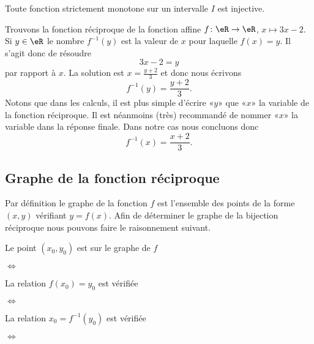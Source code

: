 \begin{remark}
  Toute fonction strictement monotone sur un intervalle $I$ est injective. 
\end{remark}

\begin{example}
    Trouvons la fonction réciproque de la fonction affine \( f\colon \eR\to \eR\), \( x\mapsto 3x-2\). Si \( y\in \eR\) le nombre \( f^{-1}(y)\) est la valeur de \( x\) pour laquelle \( f(x)=y\). Il s'agit donc de résoudre
    \begin{equation}
        3x-2=y
    \end{equation}
    par rapport à \( x\). La solution est \( x=\frac{ y+2 }{ 3 }\) et donc nous écrivons
    \begin{equation}
        f^{-1}(y)=\frac{ y+2 }{ 3 }.
    \end{equation}
    Notons que dans les calculs, il est plus simple d'écrire «\( y\)» que «\( x\)» la variable de la fonction réciproque. Il est néanmoins (très) recommandé de nommer «\( x\)» la variable dans la réponse finale. Dans notre cas nous concluons donc
    \begin{equation}
        f^{-1}(x)=\frac{ x+2 }{ 3 }.
    \end{equation}
\end{example}

\subsection{Graphe de la fonction réciproque}

Par définition le graphe de la fonction \( f\) est l'ensemble des points de la forme \( (x,y)\) vérifiant \( y=f(x)\). Afin de déterminer le graphe de la bijection réciproque nous pouvons faire le raisonnement suivant.

        Le point \( (x_0,y_0)\) est sur le graphe de \( f\)

\noindent\( \Leftrightarrow\)

        La relation \( f(x_0)=y_0\) est vérifiée

\noindent\( \Leftrightarrow\)

        La relation \( x_0=f^{-1}(y_0)\) est vérifiée

\noindent\( \Leftrightarrow\)

